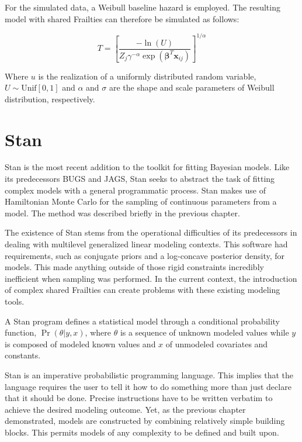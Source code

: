 For the simulated data, a Weibull baseline hazard is employed. The resulting model with shared Frailties can therefore be simulated as follows:

$$T = \left [\frac{- \ln(U) }{Z_{j} \gamma^{-\alpha}  \exp(\boldsymbol\beta^T \textbf{x}_{ij})}  \right ]^{1/\alpha} $$

Where $u$ is the realization of a uniformly distributed random variable, $U \sim \text{Unif}[0,1]$ and $\alpha$ and $\sigma$ are the shape and scale parameters of Weibull distribution, respectively.







\section*{Stan}

Stan is the most recent addition to the toolkit for fitting Bayesian models. Like its predecessors BUGS and JAGS, Stan seeks to abstract the task of fitting complex models with a general programmatic process. Stan makes use of Hamiltonian Monte Carlo for the sampling of continuous parameters from a model. The method was described briefly in the previous chapter. 

The existence of Stan stems from the operational difficulties of its predecessors in dealing with multilevel generalized linear modeling contexts. This software had requirements, such as conjugate priors and a log-concave posterior density, for models. This made anything outside of those rigid constraints incredibly inefficient when sampling was performed. In the current context, the introduction of complex shared Frailties can create problems with these existing modeling tools. 

A Stan program defines a statistical model through a conditional probability function, $\Pr(\theta|y,x)$, where $\theta$ is a sequence of unknown modeled values while $y$ is composed of modeled known values and $x$ of unmodeled covariates and constants\cite{StanDevelopmentTeam2016}. 

Stan is an imperative probabilistic programming language. This implies that the language requires the user to tell it how to do something more than just declare that it should be done. Precise instructions have to be written verbatim to achieve the desired modeling outcome. Yet, as the previous chapter demonstrated, models are constructed by combining relatively simple building blocks. This permits models of any complexity to be defined and built upon.


